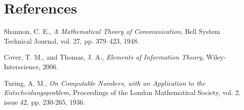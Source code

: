 \documentclass[11pt,a4paper]{article}
\theoremstyle{definition}
\theoremstyle{remark}
\numberwithin{equation}{section}
\begin{document}
\section{References}
\begin{thebibliography}{99}
    Shannon, C. E., \textit{A Mathematical Theory of Communication}, Bell System Technical Journal, vol. 27, pp. 379–423, 1948.
    
    Cover, T. M., and Thomas, J. A., \textit{Elements of Information Theory}, Wiley-Interscience, 2006.
    
    Turing, A. M., \textit{On Computable Numbers, with an Application to the Entscheidungsproblem}, Proceedings of the London Mathematical Society, vol. 2, issue 42, pp. 230-265, 1936.
\end{thebibliography}
\end{document}
